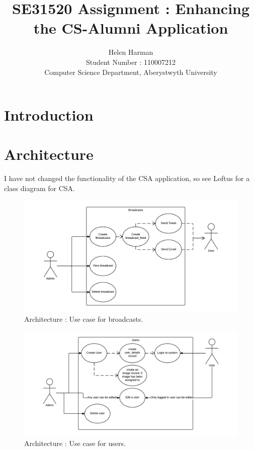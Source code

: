 \documentclass[10pt,a4paper,titlepage]{article}
\author{Helen Harman \\ Student Number : 110007212 \\ Computer Science Department, Aberystwyth University}
\title{SE31520 Assignment : Enhancing the CS-Alumni Application}
\begin{document}
\maketitle

\tableofcontents

\pagebreak 
\section{Introduction}
\section{Architecture}
I have not changed the functionality of the CSA application, so see Loftus \cite[5]{design} for a class diagram for CSA.
\begin{figure}[H]
\begin{center}
\includegraphics[scale=0.3]{include/broadcasts_Use_Case.png}  
\caption{Architecture : Use case for broadcasts. }
\label{fig:broadcastUseCase}
\end{center}
\end{figure}

\begin{figure}[H]
\begin{center}
\includegraphics[scale=0.3]{include/User_Use_Case.png}  
\caption{Architecture : Use case for users. }
\label{fig:userUseCase}
\end{center}
\end{figure}
\end{document}
